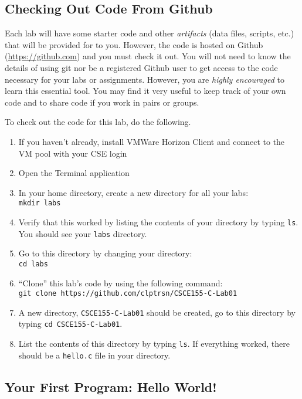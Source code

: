\documentclass[12pt]{scrartcl}
\begin{document}
\subsection{Checking Out Code From Github}

Each lab will have some starter code and other \emph{artifacts} (data files, 
scripts, etc.) that will be provided for to you.  However, the code is hosted
on Github (\url{https://github.com}) and you must check it out.  You will not
need to know the details of using git nor be a registered Github user to 
get access to the code necessary for your labs or assignments.  However, 
you are \emph{highly encouraged} to learn this essential tool.  You may find
it very useful to keep track of your own code and to share code if you work
in pairs or groups.  

To check out the code for this lab, do the following.
\begin{enumerate}
  \item If you haven't already, install VMWare Horizon Client and connect to the VM pool with your CSE login
  \item Open the Terminal application
  \item In your home directory, create a new directory for all your labs:\\  
  \texttt{mkdir labs}  
  \item Verify that this worked by listing the contents of your directory by
  typing \texttt{ls}.  You should see your \texttt{labs} directory.
   \item Go to this directory by changing your directory:\\
  \texttt{cd labs}
  \item ``Clone'' this lab's code by using the following command:\\
  \texttt{git clone https://github.com/clptrsn/CSCE155-C-Lab01}
  \item A new directory, \texttt{CSCE155-C-Lab01} should be created, 
  go to this directory by typing \texttt{cd CSCE155-C-Lab01}.
  \item List the contents of this directory by typing \texttt{ls}.  If
  everything worked, there should be a \texttt{hello.c} file in your
  directory.
\end{enumerate}

\subsection{Your First Program: Hello World!}
\end{document}
